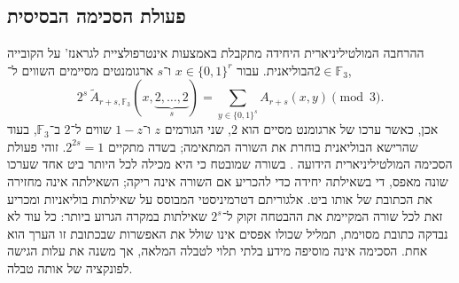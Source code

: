 \documentclass[11pt,a4paper]{article}
\theoremstyle{definition}
\theoremstyle{remark}
\newcommand{\bits}{\{0,1\}}
\newcommand{\Atil}{\widetilde A}
\newcommand{\F}{\mathbb F}
\begin{document}
\subsection{פעולת הסכימה הבסיסית}
ההרחבה המולטיליניארית היחידה מתקבלת באמצעות אינטרפולציית לגראנז' על הקובייה הבוליאנית. עבור $x\in\bits^r$ ו־$s$ ארגומנטים מסיימים השווים ל־$2\in\F_3$,
\begin{equation}\label{eq:aggregate}
2^s\,\Atil_{r+s,\F_3}(x,\underbrace{2,\ldots,2}_{s})
=\sum_{y\in\bits^s}A_{r+s}(x,y)\pmod3.
\end{equation}
אכן, כאשר ערכו של ארגומנט מסיים הוא $2$, שני הגורמים $z$ ו־$1-z$ שווים ל־$2$ ב־$\F_3$, בעוד שהרישא הבוליאנית בוחרת את השורה המתאימה; בשדה מתקיים $2^{2s}=1$. זוהי פעולת הסכימה המולטיליניארית הידועה \cite{jkrs,aw}. בשורה שמובטח כי היא מכילה לכל היותר ביט אחד שערכו שונה מאפס, די בשאילתה יחידה כדי להכריע אם השורה אינה ריקה; השאילתה אינה מחזירה את הכתובת של אותו ביט. אלגוריתם דטרמיניסטי המבוסס על שאילתות בוליאניות ומכריע זאת לכל שורה המקיימת את ההבטחה זקוק ל־$2^s$ שאילתות במקרה הגרוע ביותר: כל עוד לא נבדקה כתובת מסוימת, תמליל שכולו אפסים אינו שולל את האפשרות שבכתובת זו הערך הוא אחת. הסכימה אינה מוסיפה מידע בלתי תלוי לטבלה המלאה, אך משנה את עלות הגישה לפונקציה של אותה טבלה.
\end{document}
